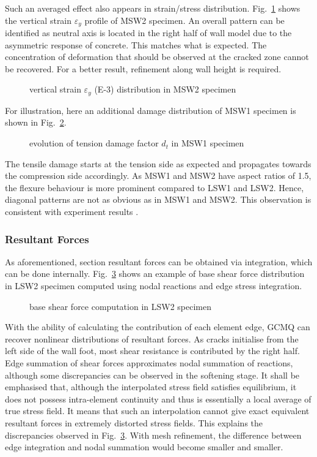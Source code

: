 \documentclass[3p,review,sort&compress,11pt,fleqn]{elsarticle}
\newcommand*{\figref}[1]{Fig.~\ref{#1}}
\begin{document}
Such an averaged effect also appears in strain/stress distribution. \figref{fig:salonikios_strain} shows the vertical strain $\varepsilon_y$ profile of MSW2 specimen. An overall pattern can be identified as neutral axis is located in the right half of wall model due to the asymmetric response of concrete. This matches what is expected. The concentration of deformation that should be observed at the cracked zone cannot be recovered. For a better result, refinement along wall height is required.
\begin{figure}[htb]
\scriptsize\centering

\caption{vertical strain $\varepsilon_y$ (\num{E-3}) distribution in MSW2 specimen}\label{fig:salonikios_strain}
\end{figure}

For illustration, here an additional damage distribution of MSW1 specimen is shown in \figref{fig:tension_damage_msw1}.
\begin{figure}[htb]
\scriptsize\centering

\caption{evolution of tension damage factor $d_t$ in MSW1 specimen}\label{fig:tension_damage_msw1}
\end{figure}
The tensile damage starts at the tension side as expected and propagates towards the compression side accordingly. As MSW1 and MSW2 have aspect ratios of \num{1.5}, the flexure behaviour is more prominent compared to LSW1 and LSW2. Hence, diagonal patterns are not as obvious as in MSW1 and MSW2. This observation is consistent with experiment results \citep{Salonikios1999}.
\subsubsection{Resultant Forces}
As aforementioned, section resultant forces can be obtained via integration, which can be done internally. \figref{fig:salonikios_shear} shows an example of base shear force distribution in LSW2 specimen computed using nodal reactions and edge stress integration.
\begin{figure}[htb]
\scriptsize\centering

\caption{base shear force computation in LSW2 specimen}\label{fig:salonikios_shear}
\end{figure}
With the ability of calculating the contribution of each element edge, GCMQ can recover nonlinear distributions of resultant forces. As cracks initialise from the left side of the wall foot, most shear resistance is contributed by the right half. Edge summation of shear forces approximates nodal summation of reactions, although some discrepancies can be observed in the softening stage. It shall be emphasised that, although the interpolated stress field satisfies equilibrium, it does not possess intra-element continuity and thus is essentially a local average of true stress field. It means that such an interpolation cannot give exact equivalent resultant forces in extremely distorted stress fields. This explains the discrepancies observed in \figref{fig:salonikios_shear}. With mesh refinement, the difference between edge integration and nodal summation would become smaller and smaller.
\end{document}
